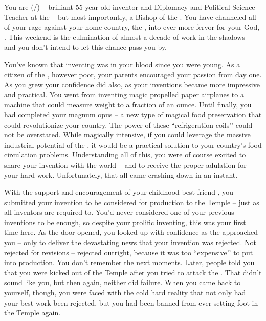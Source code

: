 \documentclass[char]{GL2020}
\begin{document}
\name{\cChupInventor{}}


You are \cChupInventor{\full} (\cChupInventor{\they}/\cChupInventor{\them}) -- brilliant 55 year-old inventor and Diplomacy and Political Science Teacher at the \pSchool{} -- but most importantly, a Bishop of the \pGoaties{}. You have channeled all of your rage against your home country, the \pTech{}, into ever more fervor for your God, \cGenesis{}. This weekend is the culmination of almost a decade of work in the shadows -- and you don't intend to let this chance pass you by.

You've known that inventing was in your blood since you were young. As a citizen of the \pTech{}, however poor, your parents encouraged your passion from day one. As you grew your confidence did also, as your inventions became more impressive and practical. You went from inventing magic propelled paper airplanes to a machine that could measure weight to a fraction of an ounce. Until finally, you had completed your magnum opus -- a new type of magical food preservation that could revolutionize your country. The power of these ``refrigeration coils'’ could not be overstated. While magically intensive, if you could leverage the massive industrial potential of the \pTech{}, it would be a practical solution to your country's food circulation problems. Understanding all of this, you were of course excited to share your invention with the world -- and to receive the proper adulation for your hard work. Unfortunately, that all came crashing down in an instant.

With the support and encouragement of your childhood best friend \cHeadScientist{\full}, you submitted your invention to be considered for production to the Temple -- just as all inventors are required to. You'd never considered one of your previous inventions to be enough, so despite your prolific inventing, this was your first time here. As the door opened, you looked up with confidence as the \cAntiChup{\cleric} approached you -- only to deliver the devastating news that your invention was rejected. Not rejected for revisions -- rejected outright, because it was too ``expensive'’ to put into production. You don't remember the next moments. Later, people told you that you were kicked out of the Temple after you tried to attack the \cAntiChup{\cleric}. That didn't sound like you, but then again, neither did failure. When you came back to yourself, though, you were faced with the cold hard reality that not only had your best work been rejected, but you had been banned from ever setting foot in the Temple again.
\end{document}
